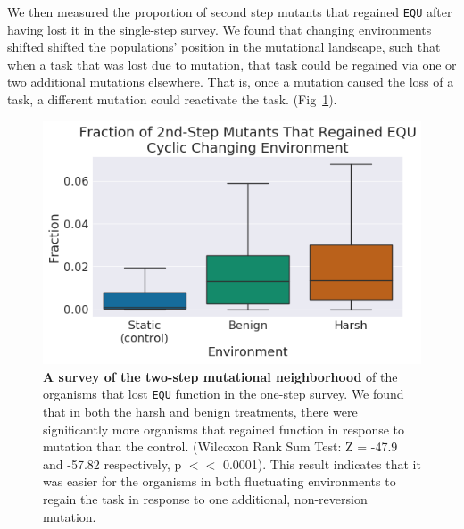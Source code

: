 \documentclass[10pt,letterpaper]{article}
\begin{document}
We then measured the proportion of second step mutants that regained \texttt{EQU} after having lost it in the single-step survey. We found that 
changing environments shifted
shifted the populations' position in the mutational landscape, such that when a task that was lost due to mutation, that task could be regained via one or two additional mutations elsewhere. That is, once a mutation caused the loss of a task, a different mutation could reactivate the task. (Fig~\ref{fig:CCE_two_step}). 

	\begin{figure}[!h] %
	\includegraphics[width=0.75\columnwidth]{figures/CE/CCE_frac_2step__box.png}
	\caption{\textbf{A survey of the two-step mutational neighborhood} of the organisms that lost \texttt{EQU} function in the one-step survey. We found that in both the harsh and benign treatments, there were significantly more organisms that regained function in response to mutation than the control. (Wilcoxon Rank Sum Test: Z = -47.9 and -57.82 respectively, p $<<$ 0.0001). This result indicates that it was easier for the organisms in both fluctuating environments to regain the task in response to one additional, non-reversion mutation.   
	}\label{fig:CCE_two_step}
	\end{figure}
\end{document}
